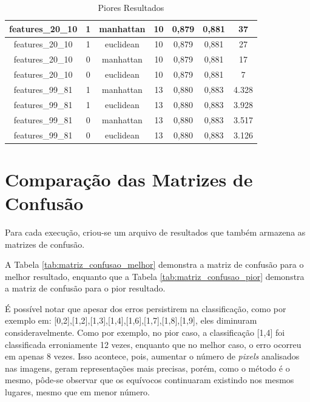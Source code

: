\documentclass[12pt]{article}
\begin{document}
\begin{table}[!htb]
\begin{tabular}{|c|c|c|c|c|c|c|}
  features\_20\_10    & 1                   & manhattan         & 10         & 0,879             & 0,881            & 37                          \\ \hline
  features\_20\_10    & 1                   & euclidean         & 10         & 0,879             & 0,881            & 27                          \\ \hline
  features\_20\_10    & 0                   & manhattan         & 10         & 0,879             & 0,881            & 17                          \\ \hline
  features\_20\_10    & 0                   & euclidean         & 10         & 0,879             & 0,881            & 7                           \\ \hline
  features\_99\_81    & 1                   & manhattan         & 13         & 0,880             & 0,883            & 4.328                       \\ \hline
  features\_99\_81    & 1                   & euclidean         & 13         & 0,880             & 0,883            & 3.928                       \\ \hline
  features\_99\_81    & 0                   & manhattan         & 13         & 0,880             & 0,883            & 3.517                       \\ \hline
  features\_99\_81    & 0                   & euclidean         & 13         & 0,880             & 0,883            & 3.126                       \\ \hline
  \end{tabular}
  \caption{Piores Resultados}
  \label{tab:resultados_piores}
\end{table}

\section{Comparação das Matrizes de Confusão}

Para cada execução, criou-se um arquivo de resultados que também armazena as matrizes de confusão.

A Tabela \ref{tab:matriz_confusao_melhor} demonstra a matriz de confusão para o melhor resultado, enquanto que a Tabela \ref{tab:matriz_confusao_pior} demonstra a matriz de confusão para o pior resultado.

É possível notar que apesar dos erros persistirem na classificação, como por exemplo em: [0,2],[1,2],[1,3],[1,4],[1,6],[1,7],[1,8],[1,9], eles diminuram consideravelmente. Como por exemplo, no pior caso, a classificação [1,4] foi classificada erroniamente 12 vezes, enquanto que no melhor caso, o erro ocorreu em apenas 8 vezes. Isso acontece, pois, aumentar o número de \textit{pixels} analisados nas imagens, geram representações mais precisas, porém, como o método é o mesmo, pôde-se observar que os equívocos continuaram existindo nos mesmos lugares, mesmo que em menor número.
\end{document}
